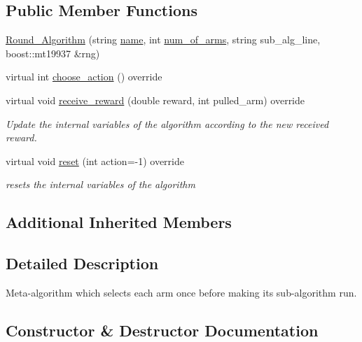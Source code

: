 \subsection*{Public Member Functions}
\begin{DoxyCompactItemize}
\item 
\mbox{\hyperlink{class_round___algorithm_abf6d3592abbbc873a002238be60399e6}{Round\+\_\+\+Algorithm}} (string \mbox{\hyperlink{class_m_a_b_algorithm_a77b10ecc4b49d519c557f65358167b82}{name}}, int \mbox{\hyperlink{class_m_a_b_algorithm_a340fa9e83e85b092f2c6125fc4e8549b}{num\+\_\+of\+\_\+arms}}, string sub\+\_\+alg\+\_\+line, boost\+::mt19937 \&rng)
\item 
virtual int \mbox{\hyperlink{class_round___algorithm_a019a9a7a564a49512f5089c3829e6f4e}{choose\+\_\+action}} () override
\item 
virtual void \mbox{\hyperlink{class_round___algorithm_a945da188a51c00d1923f4eb8434042eb}{receive\+\_\+reward}} (double reward, int pulled\+\_\+arm) override
\begin{DoxyCompactList}\small\item\em Update the internal variables of the algorithm according to the new received reward. \end{DoxyCompactList}\item 
virtual void \mbox{\hyperlink{class_round___algorithm_ae2c21984dbd89f5ba1a4f530472cf7f7}{reset}} (int action=-\/1) override
\begin{DoxyCompactList}\small\item\em resets the internal variables of the algorithm \end{DoxyCompactList}\end{DoxyCompactItemize}
\subsection*{Additional Inherited Members}


\subsection{Detailed Description}
Meta-\/algorithm which selects each arm once before making its sub-\/algorithm run. 

\subsection{Constructor \& Destructor Documentation}
\mbox{\label{class_round___algorithm_abf6d3592abbbc873a002238be60399e6}} 
